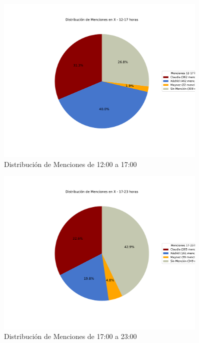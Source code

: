 \documentclass[10pt, a4paper]{article}
\begin{document}
	\newpage
	\begin{figure}[h!]
		\centering
		\includegraphics[width=0.9\textwidth]{grafica_intervalo_12-17.pdf} %
		\vspace{-15mm}
		\caption{Distribución de Menciones de 12:00 a 17:00}
		\label{fig:xIntervalo1217} %
	\end{figure}

	\begin{figure}[h!]
		\centering
		\includegraphics[width=0.9\textwidth]{grafica_intervalo_17-23.pdf} %
		\vspace{-15mm}
		\caption{Distribución de Menciones de 17:00 a 23:00}
		\label{fig:xIntervalo1723} %
	\end{figure}
	
\end{document}
